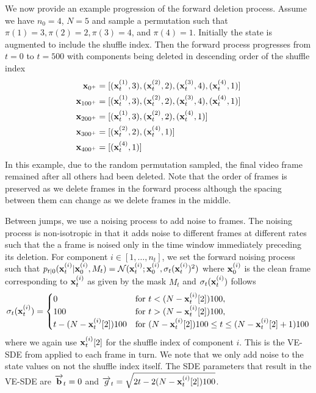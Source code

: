 We now provide an example progression of the forward deletion process. Assume we have $n_0=4$, $N=5$ and sample a permutation such that $\pi(1)=3, \pi(2)=2, \pi(3)=4$, and $\pi(4)=1$. Initially the state is augmented to include the shuffle index. Then the forward process progresses from $t=0$ to $t=500$ with components being deleted in descending order of the shuffle index
\begin{align}
    {\mathbf{x}}_{0^+}&=[({\mathbf{x}}^{(1)}_{t}, 3), ({\mathbf{x}}^{(2)}_{t}, 2), ({\mathbf{x}}^{(3)}_{t}, 4), ({\mathbf{x}}^{(4)}_{t}, 1)]\\
    {\mathbf{x}}_{100^+} &= [({\mathbf{x}}^{(1)}_{t}, 3), ({\mathbf{x}}^{(2)}_{t}, 2), ({\mathbf{x}}^{(3)}_{t}, 4), ({\mathbf{x}}^{(4)}_{t}, 1)]\\
    {\mathbf{x}}_{200^+} &= [({\mathbf{x}}^{(1)}_{t}, 3), ({\mathbf{x}}^{(2)}_{t}, 2), ({\mathbf{x}}^{(4)}_{t}, 1)]\\
    {\mathbf{x}}_{300^+} &= [({\mathbf{x}}^{(2)}_{t}, 2), ({\mathbf{x}}^{(4)}_{t}, 1)]\\
    {\mathbf{x}}_{400^+} &= [({\mathbf{x}}^{(4)}_{t}, 1)]\\
\end{align}
In this example, due to the random permutation sampled, the final video frame remained after all others had been deleted. Note that the order of frames is preserved as we delete frames in the forward process although the spacing between them can change as we delete frames in the middle.


Between jumps, we use a noising process to add noise to frames. The noising process is non-isotropic in that it adds noise to different frames at different rates such that the a frame is noised only in the time window immediately preceding its deletion. For component $i \in [1, \dots, n_t]$, we set the forward noising process such that $p_{t|0}({\mathbf{x}}_t^{(i)} | {\mathbf{x}}_0^{(i)}, M_t) = \mathcal{N}({\mathbf{x}}_t^{(i)}; {\mathbf{x}}_0^{(i)}, \sigma_t({\mathbf{x}}_t^{(i)})^2)$ where ${\mathbf{x}}_0^{(i)}$ is the clean frame corresponding to ${\mathbf{x}}_t^{(i)}$ as given by the mask $M_t$ and $\sigma_t({\mathbf{x}}_t^{(i)})$ follows
\begin{equation}
    \sigma_t({\mathbf{x}}_t^{(i)}) = \begin{cases}
        0 & \text{for } t < (N - {\mathbf{x}}_t^{(i)}[2]) 100,\\
        100 & \text{for } t > (N - {\mathbf{x}}_t^{(i)}[2]) 100,\\
        t - (N - {\mathbf{x}}_t^{(i)}[2])100 & \text{for } (N - {\mathbf{x}}_t^{(i)}[2])100 \leq t \leq (N - {\mathbf{x}}_t^{(i)}[2]+1) 100
    \end{cases}
\end{equation}
where we again use ${\mathbf{x}}_t^{(i)}[2]$ for the shuffle index of component $i$. This is the VE-SDE from \citet{song2020score} applied to each frame in turn. We note that we only add noise to the state values on not the shuffle index itself. The SDE parameters that result in the VE-SDE are $\overrightarrow{\mathbf{b}}_t = 0$ and $\overrightarrow{g}_t = \sqrt{2t - 2(N - {\mathbf{x}}_t^{(i)}[2])100}$.



